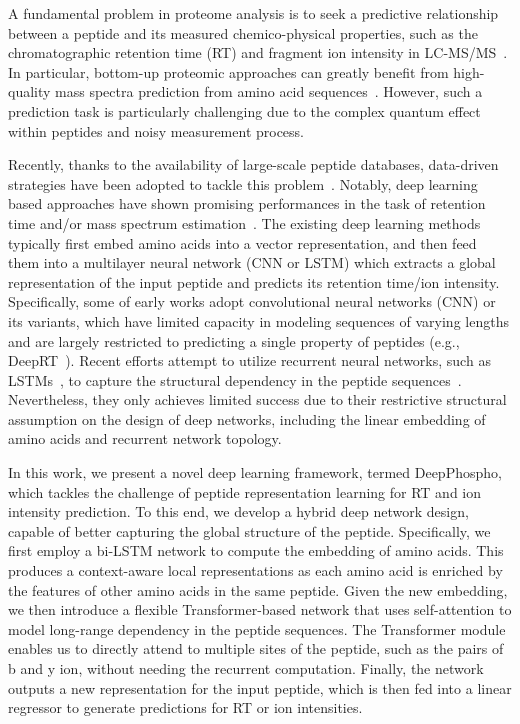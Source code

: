 
A fundamental problem in proteome analysis is to seek a predictive relationship between a peptide and its measured chemico-physical properties, such as the chromatographic retention time (RT) and fragment ion intensity in LC-MS/MS~\cite{gessulat2019prosit}. In particular, bottom-up proteomic approaches can greatly benefit from
high-quality mass spectra prediction from amino acid sequences~\cite{gessulat2019prosit}.
However, such a prediction task is particularly challenging due to the complex quantum effect within peptides and noisy measurement process.


Recently, thanks to the availability of large-scale peptide databases, data-driven strategies have been adopted to tackle this problem~\cite{arnold2006machine}.
Notably, deep learning based approaches have shown promising performances in the task of retention time and/or mass spectrum estimation~\cite{zhou2017pdeep,ma2018improved,tiwary2019high,zeng2019ms,gessulat2019prosit}. The existing deep learning methods typically first embed amino acids into a vector representation, and then feed them into a multilayer neural network (CNN or LSTM) which extracts a global representation of the input peptide and predicts its retention time/ion intensity. Specifically, some of early works adopt convolutional neural networks (CNN) or its variants, which have limited capacity in modeling sequences of varying lengths and are largely restricted to predicting a single property of peptides (e.g., DeepRT~\cite{ma2018improved}). Recent efforts attempt to utilize recurrent neural networks, such as LSTMs~\cite{hochreiter1997long}, to capture the structural dependency in the peptide sequences~\cite{zeng2019ms}. Nevertheless, they only achieves limited success due to their restrictive structural assumption on the design of deep networks, including the linear embedding of amino acids and recurrent network topology.

In this work, we present a novel deep learning framework, termed DeepPhospho, which tackles the challenge of peptide representation learning for RT and ion intensity prediction. To this end, we develop a hybrid deep network design, capable of better capturing the global structure of the peptide.
Specifically, we first employ a bi-LSTM network to compute the embedding of amino acids. This produces a context-aware local representations as each amino acid is enriched by the features of other amino acids in the same peptide. Given the new embedding, we then introduce a flexible Transformer-based network that uses self-attention to model long-range dependency in the peptide sequences. The Transformer module enables us to directly attend to multiple sites of the peptide, such as the pairs of b and y ion, without needing the recurrent computation. Finally, the network outputs a new representation for the input peptide, which is then fed into a linear regressor to generate predictions for RT or ion intensities.

